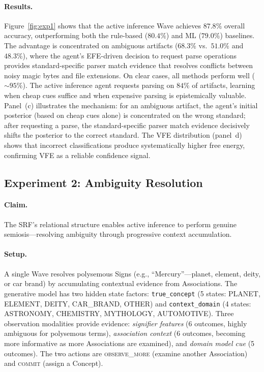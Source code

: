 \documentclass[11pt,a4paper]{article}
\theoremstyle{definition}
\begin{document}
\paragraph{Results.} Figure~\ref{fig:exp1} shows that the active inference Wave achieves $87.8\%$ overall accuracy, outperforming both the rule-based ($80.4\%$) and ML ($79.0\%$) baselines. The advantage is concentrated on ambiguous artifacts ($68.3\%$ vs.\ $51.0\%$ and $48.3\%$), where the agent's EFE-driven decision to request parse operations provides standard-specific parser match evidence that resolves conflicts between noisy magic bytes and file extensions. On clear cases, all methods perform well ($\sim 95\%$). The active inference agent requests parsing on $84\%$ of artifacts, learning when cheap cues suffice and when expensive parsing is epistemically valuable. Panel~(c) illustrates the mechanism: for an ambiguous artifact, the agent's initial posterior (based on cheap cues alone) is concentrated on the wrong standard; after requesting a parse, the standard-specific parser match evidence decisively shifts the posterior to the correct standard. The VFE distribution (panel~d) shows that incorrect classifications produce systematically higher free energy, confirming VFE as a reliable confidence signal.

\subsection{Experiment 2: Ambiguity Resolution}
\label{sec:exp2}

\paragraph{Claim.} The SRF's relational structure enables active inference to perform genuine semiosis---resolving ambiguity through progressive context accumulation.

\paragraph{Setup.} A single Wave resolves polysemous Signs (e.g., ``Mercury''---planet, element, deity, or car brand) by accumulating contextual evidence from Associations. The generative model has two hidden state factors: \texttt{true\_concept} (5 states: PLANET, ELEMENT, DEITY, CAR\_BRAND, OTHER) and \texttt{context\_domain} (4 states: ASTRONOMY, CHEMISTRY, MYTHOLOGY, AUTOMOTIVE). Three observation modalities provide evidence: \emph{signifier features} (6 outcomes, highly ambiguous for polysemous terms), \emph{association context} (6 outcomes, becoming more informative as more Associations are examined), and \emph{domain model cue} (5 outcomes). The two actions are \textsc{observe\_more} (examine another Association) and \textsc{commit} (assign a Concept).
\end{document}
